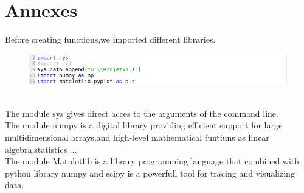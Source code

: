 \chapter*{Annexes}

Before creating functions,we imported different libraries.
\begin{figure}[bth]%
\begin{center}
\includegraphics[scale=0.75]{import_bibliotheque}%
\label{read_}%
\end {center}
\end{figure}
\\The module sys gives direct acces to the arguments of the command line.
\\The module numpy is a digital library providing efficient support for large multidimensional arrays,and high-level mathematical funtiuns as linear algebra,statistics ...
\\The module Matplotlib is a library programming language that combined with python library numpy and scipy is a powerfull tool for tracing and visualizing data.

